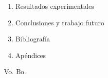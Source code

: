 \documentclass[12pt]{article}
\begin{document}
\begin{enumerate}
\begin{enumerate}
            \item Arquitectura del sistema de recuperación
            
            \item Modelos de recuperación base
            
            \item Algoritmos de fusión
            
            \item Diseño experimental
            \begin{enumerate}
                \item Experimento 1: fusión \textit{vs.} modelos individuales
                
                \item Experimento 2: comparación de algoritmos de fusión
                
                \item Experimento 3: algoritmos de fusión \textit{vs.} reordenamiento neuronal
                
                \item Experimento 4: modelos abiertos \textit{vs.} propietarios
            \end{enumerate}
        \end{enumerate}
        
        \item Resultados experimentales
        
        \item Conclusiones y trabajo futuro
        
        \item Bibliografía
        
        \item Apéndices
    \end{enumerate}
    
    
    \printbibliography
    
    
    
    \newpage
    \vfill
    \Large{Vo. Bo.}
    \vspace{7cm}
    
\end{document}
